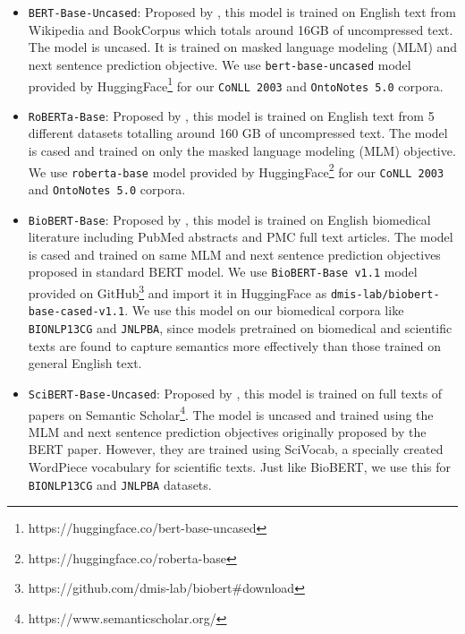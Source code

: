 \begin{itemize}
    \item \texttt{BERT-Base-Uncased}: Proposed by \cite{devlin2018bert}, this model is trained on English text from Wikipedia and BookCorpus\cite{moviebook} which totals around 16GB of uncompressed text. The model is uncased. It is trained on masked language modeling (MLM) and next sentence prediction objective. We use \texttt{bert-base-uncased} model provided by HuggingFace\footnote{https://huggingface.co/bert-base-uncased} for our \texttt{CoNLL 2003} and \texttt{OntoNotes 5.0} corpora.
    
    \item \texttt{RoBERTa-Base}: Proposed by \cite{}, this model is trained on English text from 5 different datasets totalling around 160 GB of uncompressed text. The model is cased and trained on only the masked language modeling (MLM) objective. We use \texttt{roberta-base} model provided by HuggingFace\footnote{https://huggingface.co/roberta-base} for our \texttt{CoNLL 2003} and \texttt{OntoNotes 5.0} corpora.
    
    \item \texttt{BioBERT-Base}: Proposed by \cite{}, this model is trained on English biomedical literature including PubMed abstracts and PMC full text articles. The model is cased and trained on same MLM and next sentence prediction objectives proposed in standard BERT model. We use \texttt{BioBERT-Base v1.1} model provided on GitHub\footnote{https://github.com/dmis-lab/biobert\#download} and import it in HuggingFace as \texttt{dmis-lab/biobert-base-cased-v1.1}. We use this model on our biomedical corpora like \texttt{BIONLP13CG} and \texttt{JNLPBA}, since models pretrained on biomedical and scientific texts are found to capture semantics more effectively than those trained on general English text.
    
    \item \texttt{SciBERT-Base-Uncased}: Proposed by \cite{}, this model is trained on full texts of papers on Semantic Scholar\footnote{https://www.semanticscholar.org/}. The model is uncased and trained using the MLM and next sentence prediction objectives originally proposed by the BERT paper. However, they are trained using SciVocab, a specially created WordPiece vocabulary for scientific texts. Just like BioBERT, we use this for \texttt{BIONLP13CG} and \texttt{JNLPBA} datasets.
    
\end{itemize}

